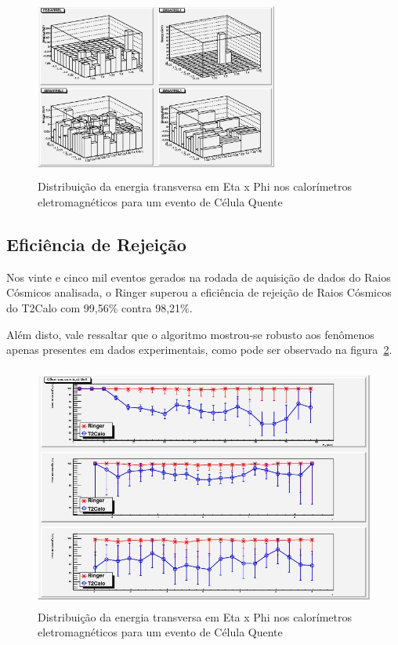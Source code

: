\documentclass[a4paper,10pt,titlepage]{article}
\begin{document}
\begin{figure}[htbp!]
 \centering
 \includegraphics[width=8cm,height=6cm]{Figs/cosmics/rc_hot_em1.eps}
 \caption{Distribuição da energia transversa em Eta x Phi nos calorímetros eletromagnéticos para um evento de Célula Quente}
 \label{fig:rc_hot_em1}
\end{figure}

\subsection{Eficiência de Rejeição}

Nos vinte e cinco mil eventos gerados na rodada de aquisição de dados do Raios Cósmicos analisada, o Ringer superou a eficiência de rejeição de Raios Cósmicos do T2Calo com 99,56\% contra 98,21\%.

Além disto, vale ressaltar que o algoritmo mostrou-se robusto aos fenômenos apenas presentes em dados experimentais, como pode ser observado na figura~\ref{fig:cosmics_rejection_effics}.

\begin{figure}[htbp!]
 \centering
 \includegraphics[width=12cm,height=8cm]{Figs/cosmics/cosmics_rejection_effics.jpg}
 \caption{Distribuição da energia transversa em Eta x Phi nos calorímetros eletromagnéticos para um evento de Célula Quente}
 \label{fig:cosmics_rejection_effics}
\end{figure}
\end{document}
